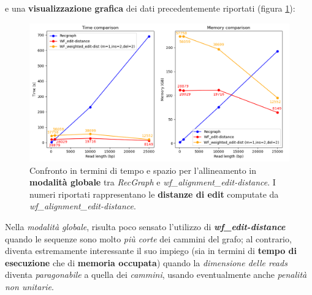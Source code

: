     e una \textbf{visualizzazione grafica} dei dati precedentemente riportati (figura \ref{fig:global_comparison}):
    \begin{figure}[!h]
        \centering
        \includegraphics[width=1.0\linewidth]{images/global_comparison.png} 
        \caption[Confronto modalità globale]{Confronto in termini di tempo e spazio per l'allineamento in \textbf{modalità globale} tra \emph{RecGraph} e \emph{wf\_alignment\_edit-distance}. I numeri riportati rappresentano le \textbf{distanze di edit} computate da \emph{wf\_alignment\_edit-distance}.}
        \label{fig:global_comparison}
    \end{figure}
    \vspace{20pt}
    
    Nella \emph{modalità globale}, risulta poco sensato l'utilizzo di \textbf{\textit{wf\_edit-distance}} quando le sequenze sono molto \emph{più corte} dei cammini del grafo; al contrario, diventa estremamente interessante il suo impiego (sia in termini di \textbf{tempo di esecuzione} che di \textbf{memoria occupata}) quando la \emph{dimensione delle reads} diventa \emph{paragonabile} a quella dei \emph{cammini}, usando eventualmente anche \emph{penalità non unitarie}. 
    \clearpage
    
